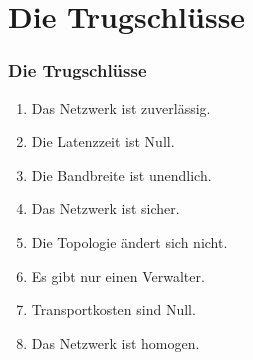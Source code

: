 \section{Die Trugschlüsse}
\begin{frame}
\frametitle{Die Trugschlüsse}
  \begin{enumerate}
  \item Das Netzwerk ist zuverlässig.
  \item Die Latenzzeit ist Null.
  \item Die Bandbreite ist unendlich.
  \item Das Netzwerk ist sicher.
  \item Die Topologie ändert sich nicht.
  \item Es gibt nur einen Verwalter.
  \item Transportkosten sind Null.
  \item Das Netzwerk ist homogen.
  \end{enumerate}
\end{frame}
